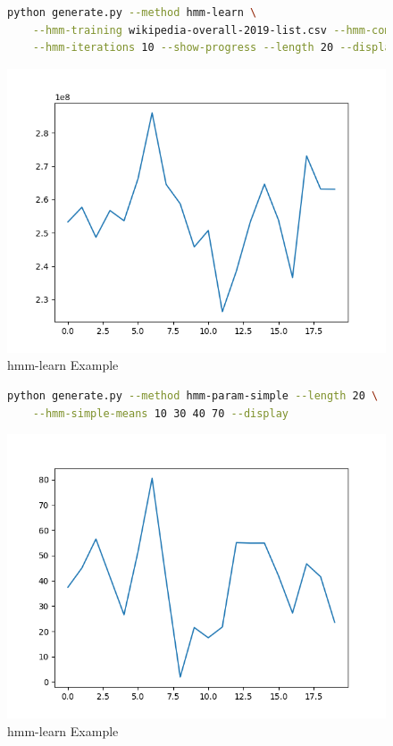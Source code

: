 \begin{figure}
\begin{lstlisting}[language=bash]
    python generate.py --method hmm-learn \
    --hmm-training wikipedia-overall-2019-list.csv --hmm-components 4 \
    --hmm-iterations 10 --show-progress --length 20 --display
\end{lstlisting}
\includegraphics[scale=0.7]{figures/hmm-learn}
\caption{hmm-learn Example}    
\label{fig:hmm-learn-example}
\end{figure}

\begin{figure}
\begin{lstlisting}[language=bash]
    python generate.py --method hmm-param-simple --length 20 \
    --hmm-simple-means 10 30 40 70 --display
\end{lstlisting}
\includegraphics[scale=0.7]{figures/hmm-param-simple}
\caption{hmm-learn Example}    
\label{fig:hmm-param-simple-example}
\end{figure}

